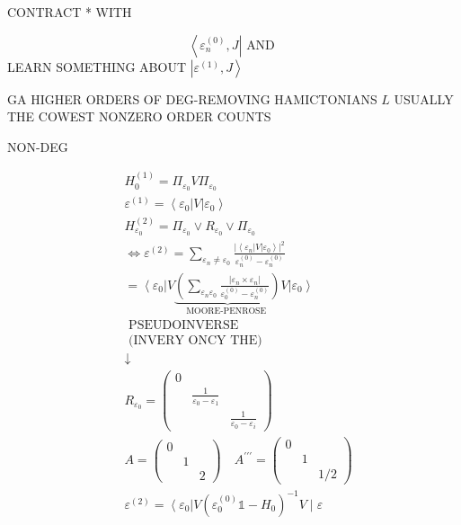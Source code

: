 CONTRACT * WITH

$$
\left\langle\varepsilon_{n}^{(0)}, J\right| \text { AND }
$$
LEARN SOMETHING ABOUT $\left|\varepsilon^{(1)}, J\right\rangle$

GA HIGHER ORDERS OF DEG-REMOVING HAMICTONIANS $L$ USUALLY THE COWEST NONZERO ORDER COUNTS

NON-DEG

$$
\begin{aligned}
& H_{0}^{(1)}=\Pi_{\varepsilon_{0}} V \Pi_{\varepsilon_{0}} \\
& \varepsilon^{(1)}=\left\langle\varepsilon_{0}\right| V\left|\varepsilon_{0}\right\rangle \\
& H_{\varepsilon_{0}}^{(2)}=\Pi_{\varepsilon_{0}} \vee R_{\varepsilon_{0}} \vee \Pi_{\varepsilon_{0}} \\
& \Leftrightarrow \varepsilon^{(2)}=\sum_{\varepsilon_{n} \neq \varepsilon_{0}} \frac{\left|\left\langle\varepsilon_{n}\right| V\left|\varepsilon_{0}\right\rangle\right|^{2}}{\varepsilon_{n}^{(0)}-\varepsilon_{n}^{(0)}} \\
& =\left\langle\varepsilon_{0}\right| V \underbrace{\left(\sum_{\varepsilon_{n} \varepsilon_{0}} \frac{\left|\varepsilon_{n} \times \varepsilon_{n}\right|}{\varepsilon_{0}^{(0)}-\varepsilon_{n}^{(0)}}\right)}_{\text {MOORE-PENROSE }} V\left|\varepsilon_{0}\right\rangle \\
& \text { PSEUDOINVERSE } \\
& \text { (INVERY ONCY THE) } \\
& \downarrow \\
& R_{\varepsilon_{0}}=\left(\begin{array}{ccl}
0 & & \\
& \frac{1}{\varepsilon_{0}-\varepsilon_{1}} & \\
& & \frac{1}{\varepsilon_{0}-\varepsilon_{i}}
\end{array}\right) \\
& A=\left(\begin{array}{lll}0 & & \\ & 1 & \\ & & 2\end{array}\right) \quad A^{\prime \prime \prime}=\left(\begin{array}{lll}0 & & \\ & 1 & \\ & & 1 / 2\end{array}\right) \\
& \varepsilon^{(2)}=\left\langle\varepsilon_{0}\right| V\left(\varepsilon_{0}^{(0)} \mathbb{1}-H_{0}\right)^{-1} V \mid \varepsilon \\

\end{aligned}$$
